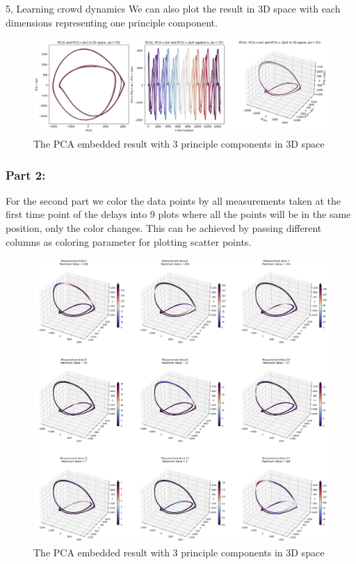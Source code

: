 \documentclass[10pt,a4paper]{article}
\begin{document}
\begin{task}{5, Learning crowd dynamics}
We can also plot the result in 3D space with each dimensions representing one principle component.

\begin{figure}[H]
    \centering
    \includegraphics[width=15cm]{images/task5-1-2.png}
    \caption{The PCA embedded result with 3 principle components in 3D space}
    \label{5-1-2}
\end{figure}


\subsubsection*{Part 2:}
For the second part we color the data points by all measurements taken at the first time point of the delays into 9 plots where all the points will be in the same position, only the color changes. This can be achieved by passing different columns as coloring parameter for plotting scatter points.

\begin{figure}[H]
    \centering
    \includegraphics[width=15cm]{images/task5-2.png}
    \caption{The PCA embedded result with 3 principle components in 3D space}
    \label{5-2}
\end{figure}



\end{task}
\end{document}
